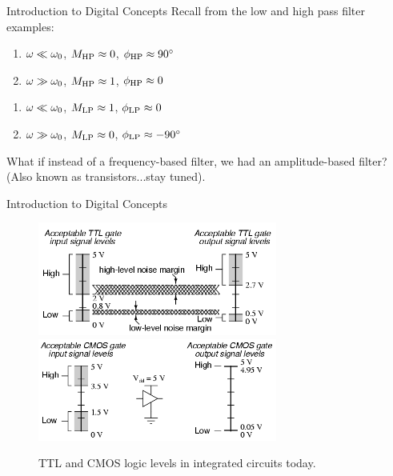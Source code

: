 \documentclass{beamer}
\begin{document}
\begin{frame}{Introduction to Digital Concepts}
Recall from the low and high pass filter examples:
\begin{enumerate}
\item $\omega \ll \omega_{\rm 0}$, $M_{\rm HP} \approx 0$, $\phi_{\rm HP} \approx 90^{\circ}$
\item $\omega \gg \omega_{\rm 0}$, $M_{\rm HP} \approx 1$, $\phi_{\rm HP} \approx 0$
\end{enumerate}
\hrulefill
\begin{enumerate}
\item $\omega \ll \omega_{\rm 0}$, $M_{\rm LP} \approx 1$, $\phi_{\rm LP} \approx 0$
\item $\omega \gg \omega_{\rm 0}$, $M_{\rm LP} \approx 0$, $\phi_{\rm LP} \approx -90^{\circ}$
\end{enumerate}
What if instead of a frequency-based filter, we had an amplitude-based filter? (Also known as transistors...stay tuned).
\end{frame}

\begin{frame}{Introduction to Digital Concepts}
\begin{figure}
\centering
\includegraphics[width=0.7\textwidth]{figures/TTL.png} \hspace{0.1cm}
\includegraphics[width=0.7\textwidth]{figures/CMOS.png}
\caption{\label{fig:levels} TTL and CMOS logic levels in integrated circuits today.}
\end{figure}
\end{frame}
\end{document}
